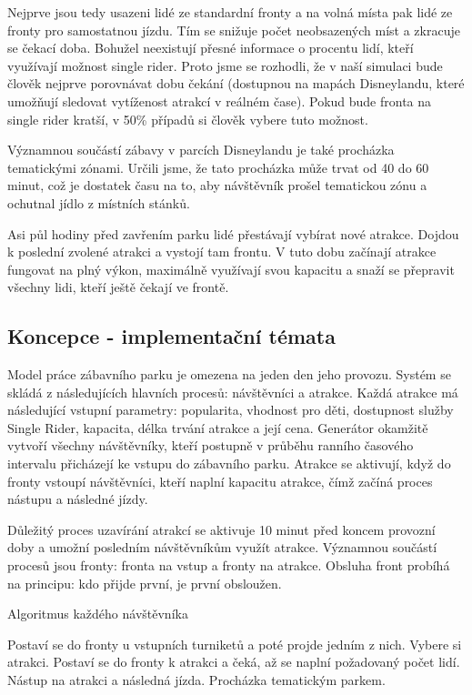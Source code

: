 \documentclass[a4paper,12pt]{article}
\begin{document}
Nejprve jsou tedy usazeni lidé ze standardní fronty a na volná místa pak lidé ze fronty pro samostatnou jízdu. Tím se snižuje počet neobsazených míst a zkracuje se čekací doba.
Bohužel neexistují přesné informace o procentu lidí, kteří využívají možnost single rider. Proto jsme se rozhodli, že v naší simulaci bude člověk nejprve porovnávat dobu čekání (dostupnou na mapách Disneylandu, které umožňují sledovat vytíženost atrakcí v reálném čase). Pokud bude fronta na single rider kratší, v 50\% případů si člověk vybere tuto možnost.


Významnou součástí zábavy v parcích Disneylandu je také procházka tematickými zónami. Určili jsme, že tato procházka může trvat od 40 do 60 minut, což je dostatek času na to, aby návštěvník prošel tematickou zónu a ochutnal jídlo z místních stánků.

Asi půl hodiny před zavřením parku lidé přestávají vybírat nové atrakce. Dojdou k poslední zvolené atrakci a vystojí tam frontu. V tuto dobu začínají atrakce fungovat na plný výkon, maximálně využívají svou kapacitu a snaží se přepravit všechny lidi, kteří ještě čekají ve frontě.



\subsection{Koncepce - implementační témata}
Model práce zábavního parku je omezena na jeden den jeho provozu.
Systém se skládá z následujících hlavních procesů: návštěvníci a atrakce. Každá atrakce má následující vstupní parametry: popularita, vhodnost pro děti, dostupnost služby Single Rider, kapacita, délka trvání atrakce a její cena. Generátor okamžitě vytvoří všechny návštěvníky, kteří postupně v průběhu ranního časového intervalu přicházejí ke vstupu do zábavního parku. Atrakce se aktivují, když do fronty vstoupí návštěvníci, kteří naplní kapacitu atrakce, čímž začíná proces nástupu a následné jízdy.

Důležitý proces uzavírání atrakcí se aktivuje 10 minut před koncem provozní doby a umožní posledním návštěvníkům využít atrakce. Významnou součástí procesů jsou fronty: fronta na vstup a fronty na atrakce. Obsluha front probíhá na principu: kdo přijde první, je první obsloužen.

\begin{algorithm}
\caption{Algoritmus každého návštěvníka}
\begin{algorithmic}[1]
    \State Postaví se do fronty u vstupních turniketů a poté projde jedním z nich.
        \State Vybere si atrakci.
        \State Postaví se do fronty k atrakci a čeká, až se naplní požadovaný počet lidí.
        \State Nástup na atrakci a následná jízda.
            \State Procházka tematickým parkem.
        \EndIf
    \EndWhile
\end{algorithmic}
\end{algorithm}
\end{document}
